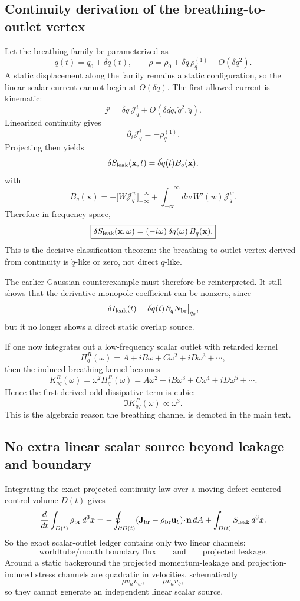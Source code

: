 \documentclass[11pt]{article}
\begin{document}
\subsection{Continuity derivation of the breathing-to-outlet vertex}
\label{app:scalar-ledger-breathing-vertex}

Let the breathing family be parameterized as
\[
q(t)=q_0+\delta q(t),
\qquad
\rho=\rho_0+\delta q\,\rho_q^{(1)}+O(\delta q^2).
\]
A static displacement along the family remains a static configuration, so the
linear scalar current cannot begin at $O(\delta q)$.  The first allowed current
is kinematic:
\[
j^i=\dot{\delta q}\,\mathcal J_q^i+O(\delta q\dot q,\dot q^2,\ddot q).
\]
Linearized continuity gives
\[
\partial_i\mathcal J_q^i=-\rho_q^{(1)}.
\]
Projecting then yields
\[
\delta S_{\rm leak}(\mathbf x,t)=\dot{\delta q}(t)B_q(\mathbf x),
\]
with
\[
B_q(\mathbf x)
=
-
\bigl[W\mathcal J_q^w\bigr]_{-\infty}^{+\infty}
+
\int_{-\infty}^{+\infty}dw\,W'(w)\mathcal J_q^w.
\]
Therefore in frequency space,
\[
\boxed{
\delta S_{\rm leak}(\mathbf x,\omega)=(-i\omega)\,\delta q(\omega)\,B_q(\mathbf x).
}
\]
This is the decisive classification theorem: the breathing-to-outlet vertex
derived from continuity is $\dot q$-like or zero, not direct $q$-like.

The earlier Gaussian counterexample must therefore be reinterpreted.  It still
shows that the derivative monopole coefficient can be nonzero, since
\[
\delta I_{\rm leak}(t)=\dot{\delta q}(t)\,\partial_q N_{\rm br}\big|_{q_0},
\]
but it no longer shows a direct static overlap source.

If one now integrates out a low-frequency scalar outlet with retarded kernel
\[
\Pi_q^R(\omega)=A+iB\omega+C\omega^2+iD\omega^3+\cdots,
\]
then the induced breathing kernel becomes
\[
K_{qq}^R(\omega)=\omega^2\Pi_q^R(\omega)
=
A\omega^2+iB\omega^3+C\omega^4+iD\omega^5+\cdots.
\]
Hence the first derived odd dissipative term is cubic:
\[
\boxed{\Im K_{qq}^R(\omega)\propto \omega^3.}
\]
This is the algebraic reason the breathing channel is demoted in the main text.

\subsection{No extra linear scalar source beyond leakage and boundary}
\label{app:scalar-ledger-no-third-source}

Integrating the exact projected continuity law over a moving defect-centered
control volume $D(t)$ gives
\[
\frac{d}{dt}\int_{D(t)}\rho_{\rm br}\,d^3x
=
-\oint_{\partial D(t)}(\mathbf J_{\rm br}-\rho_{\rm br}\mathbf u_b)\!\cdot\!\mathbf n\,dA
+
\int_{D(t)}S_{\rm leak}\,d^3x.
\]
So the exact scalar-outlet ledger contains only two linear channels:
\[
\boxed{\text{worldtube/mouth boundary flux}}
\qquad\text{and}\qquad
\boxed{\text{projected leakage}}.
\]
Around a static background the projected momentum-leakage and
projection-induced stress channels are quadratic in velocities, schematically
\[
\rho v_a v_w,
\qquad
\rho v_a v_b,
\]
so they cannot generate an independent linear scalar source.
\end{document}
